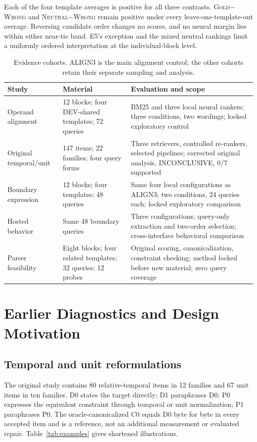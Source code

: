 \documentclass[conference,letterpaper]{IEEEtran}
\newcommand{\wrong}{\textsc{Wrong}}
\newcommand{\neutral}{\textsc{Neutral}}
\newcommand{\gold}{\textsc{Gold}}
\begin{document}
Each of the four template averages is positive for all three contrasts. \gold$-$\wrong{} and \neutral$-$\wrong{} remain positive under every leave-one-template-out average. Reversing candidate order changes no scores, and no neural margin lies within either near-tie band. E5's exception and the mixed neutral rankings limit a uniformly ordered interpretation at the individual-block level.


\begin{table}[t]
\caption{Evidence cohorts. ALIGN3 is the main alignment control; the other cohorts retain their separate sampling and analysis.}
\label{tab:cohorts}
\centering\small
\begin{tabular}{p{}p{}p{}}
\toprule
Study & Material & Evaluation and scope \\
\midrule
Operand alignment & 12 blocks; four DEV-shared templates; 72 queries & BM25 and three local neural rankers; three conditions, two wordings; locked exploratory control \\
Original temporal/unit & 147 items; 22 families; four query forms & Three retrievers, controlled re-rankers, selected pipelines; corrected original analysis, INCONCLUSIVE, 0/7 supported \\
Boundary expression & 12 blocks; four templates; 48 queries & Same four local configurations as ALIGN3; two conditions, 24 queries each; locked exploratory comparison \\
Hosted behavior & Same 48 boundary queries & Three configurations; query-only extraction and two-order selection; cross-interface behavioral comparison \\
Parser feasibility & Eight blocks; four related templates; 32 queries; 12 probes & Original scoring, canonicalization, constraint checking; method locked before new material; zero query coverage \\
\bottomrule
\end{tabular}
\end{table}

\section{Earlier Diagnostics and Design Motivation}\label{sec:earlier}
\subsection{Temporal and unit reformulations}
The original study contains 80 relative-temporal items in 12 families and 67 unit items in ten families. D0 states the target directly; D1 paraphrases D0; P0 expresses the equivalent constraint through temporal or unit normalization; P1 paraphrases P0. The oracle-canonicalized C0 equals D0 byte for byte in every accepted item and is a reference, not an additional measurement or evaluated repair. Table~\ref{tab:examples} gives shortened illustrations.
\end{document}
